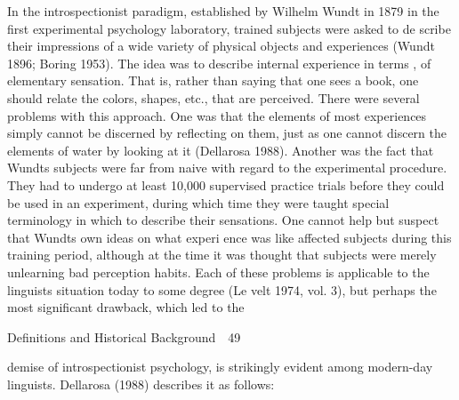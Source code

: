 \begin{styleStandard}
In the introspectionist paradigm, established by Wilhelm Wundt in 1879 in the first experimental psychology laboratory, trained subjects were asked to de\- scribe their impressions of a wide variety of physical objects and experiences (Wundt 1896; Boring 1953). The idea was to describe internal experience in terms , of elementary sensation. That is, rather than saying that one sees a book, one should relate the colors, shapes, etc., that are perceived. There were several problems with this approach. One was that the elements of most experiences simply cannot be discerned by reflecting on them, just as one cannot discern the elements of water by looking at it (Dellarosa 1988). Another was the fact that Wundt{\textquotesingle}s subjects were far from naive with regard to the experimental procedure. They had to undergo at least 10,000 supervised practice trials before they could be used in an experiment, during which time they were taught special terminology in which to describe their sensations. One cannot help but suspect that Wundt{\textquotesingle}s own ideas on what experi\- ence was like affected subjects during this training period, although at the time it was thought that subjects were merely unlearning bad perception habits. Each of these problems is applicable to the linguist{\textquotesingle}s situation today to some degree (Le\- velt 1974, vol. 3), but perhaps the most significant drawback, which led to the
\end{styleStandard}


\clearpage\setcounter{page}{1}\begin{styleStandard}
Definitions and Historical Background\ \ 49
\end{styleStandard}


\begin{styleTextbody}
demise of introspectionist psychology, is strikingly evident among modern-day linguists. Dellarosa (1988) describes it as follows:
\end{styleTextbody}


